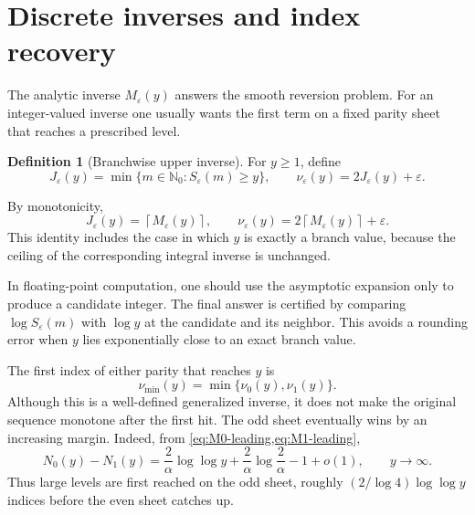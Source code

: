 \documentclass[11pt,a4paper]{article}
\theoremstyle{clean}
\theoremstyle{definition}
\newtheorem{definition}[theorem]{Definition}
\newcommand{\eps}{\varepsilon}
\newcommand{\al}{\alpha}
\newcommand{\N}{\mathbb N}
\begin{document}
\section{Discrete inverses and index recovery}
\label{sec:discrete}

The analytic inverse \(M_\eps(y)\) answers the smooth reversion problem.  For an integer-valued inverse one usually wants the first term on a fixed parity sheet that reaches a prescribed level.

\begin{definition}[Branchwise upper inverse]
For \(y\ge1\), define
\begin{equation}
 J_\eps(y)=\min\{m\in\N_0:S_\eps(m)\ge y\},
 \qquad
 \nu_\eps(y)=2J_\eps(y)+\eps.
 \label{eq:discrete-inverse}
\end{equation}
\end{definition}

By monotonicity,
\begin{equation}
 J_\eps(y)=\left\lceil M_\eps(y)\right\rceil,
 \qquad
 \nu_\eps(y)=2\left\lceil M_\eps(y)\right\rceil+\eps.
 \label{eq:ceil-inverse}
\end{equation}
This identity includes the case in which \(y\) is exactly a branch value, because the ceiling of the corresponding integral inverse is unchanged.

In floating-point computation, one should use the asymptotic expansion only to produce a candidate integer.  The final answer is certified by comparing \(\log S_\eps(m)\) with \(\log y\) at the candidate and its neighbor.  This avoids a rounding error when \(y\) lies exponentially close to an exact branch value.

The first index of either parity that reaches \(y\) is
\begin{equation}
 \nu_{\min}(y)=\min\{\nu_0(y),\nu_1(y)\}.
 \label{eq:global-first-hit}
\end{equation}
Although this is a well-defined generalized inverse, it does not make the original sequence monotone after the first hit.  The odd sheet eventually wins by an increasing margin.  Indeed, from \cref{eq:M0-leading,eq:M1-leading},
\begin{equation}
 N_0(y)-N_1(y)
 =\frac{2}{\al}\log\log y
 +\frac{2}{\al}\log\frac{2}{\al}-1+o(1),
 \qquad y\to\infty.
 \label{eq:sheet-gap}
\end{equation}
Thus large levels are first reached on the odd sheet, roughly \((2/\log4)\log\log y\) indices before the even sheet catches up.
\end{document}
